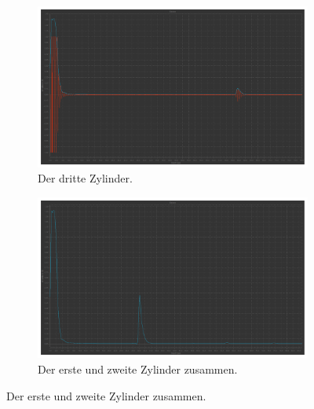 \begin{figure}
  \begin{subfigure}{0.48\textwidth}%
  \centering%
  \includegraphics[width=\linewidth]{pictures/Impuls-Echo-Zylinder/z3.pdf}%
  \caption{Der dritte Zylinder.}%
  \label{fig:echo_z3}%
  \end{subfigure}%
  \hfill%
  \begin{subfigure}{0.48\textwidth}%
  \centering%
  \includegraphics[width=\linewidth]{pictures/Impuls-Echo-Zylinder/z1_z2.pdf}%
  \caption{Der erste und zweite Zylinder zusammen.}%
  \label{fig:echo_z1_z2}%
  \end{subfigure}%
  \hfill


\end{figure}
